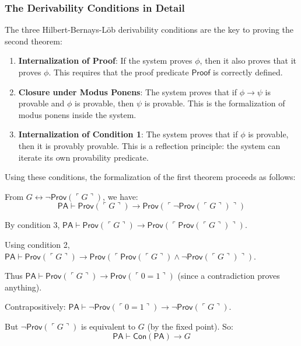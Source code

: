 \subsubsection*{The Derivability Conditions in Detail}

The three Hilbert-Bernays-Löb derivability conditions are the key to proving the second theorem:

\begin{enumerate}
\item \textbf{Internalization of Proof}: If the system proves $\phi$, then it also proves that it proves $\phi$. This requires that the proof predicate $\mathsf{Proof}$ is correctly defined.

\item \textbf{Closure under Modus Ponens}: The system proves that if $\phi \to \psi$ is provable and $\phi$ is provable, then $\psi$ is provable. This is the formalization of modus ponens inside the system.

\item \textbf{Internalization of Condition 1}: The system proves that if $\phi$ is provable, then it is provably provable. This is a reflection principle: the system can iterate its own provability predicate.
\end{enumerate}

Using these conditions, the formalization of the first theorem proceeds as follows:

From $G \leftrightarrow \neg \mathsf{Prov}(\ulcorner G \urcorner)$, we have:
\[
\mathsf{PA} \vdash \mathsf{Prov}(\ulcorner G \urcorner) \to \mathsf{Prov}(\ulcorner \neg \mathsf{Prov}(\ulcorner G \urcorner) \urcorner)
\]

By condition 3, $\mathsf{PA} \vdash \mathsf{Prov}(\ulcorner G \urcorner) \to \mathsf{Prov}(\ulcorner \mathsf{Prov}(\ulcorner G \urcorner) \urcorner)$.

Using condition 2, $\mathsf{PA} \vdash \mathsf{Prov}(\ulcorner G \urcorner) \to \mathsf{Prov}(\ulcorner \mathsf{Prov}(\ulcorner G \urcorner) \land \neg \mathsf{Prov}(\ulcorner G \urcorner) \urcorner)$.

Thus $\mathsf{PA} \vdash \mathsf{Prov}(\ulcorner G \urcorner) \to \mathsf{Prov}(\ulcorner 0=1 \urcorner)$ (since a contradiction proves anything).

Contrapositively: $\mathsf{PA} \vdash \neg \mathsf{Prov}(\ulcorner 0=1 \urcorner) \to \neg \mathsf{Prov}(\ulcorner G \urcorner)$.

But $\neg \mathsf{Prov}(\ulcorner G \urcorner)$ is equivalent to $G$ (by the fixed point). So:
\[
\mathsf{PA} \vdash \mathsf{Con}(\mathsf{PA}) \to G
\]

